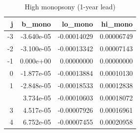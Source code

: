 \begin{table}

\caption{High monopsony (1-year lead)}
\centering
\begin{tabular}[t]{rrrr}
\toprule
j & b\_mono & lo\_mono & hi\_mono\\
\midrule
-3 & -3.640e-05 & -0.00014029 & 0.00006749\\
-2 & -3.100e-05 & -0.00013342 & 0.00007143\\
-1 & 0.000e+00 & 0.00000000 & 0.00000000\\
0 & -1.877e-05 & -0.00013884 & 0.00010130\\
1 & -2.848e-05 & -0.00018533 & 0.00012838\\
\addlinespace
2 & 3.734e-05 & -0.00010603 & 0.00018072\\
3 & 4.517e-05 & -0.00007926 & 0.00016961\\
4 & 6.752e-05 & -0.00007455 & 0.00020958\\
\bottomrule
\end{tabular}
\end{table}
